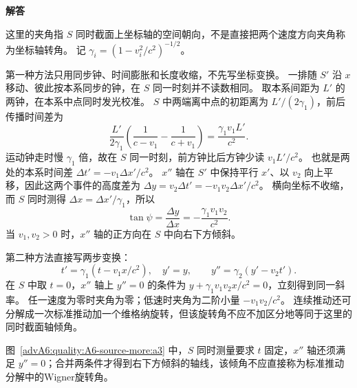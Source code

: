 \begin{advsolution}
\begin{center}\begin{minipage}{.96\linewidth}\centering
\raggedright{\bfseries\color{DeepBlue}解答}\par\smallskip\centering

\label{advA6:quality:A6-source-more:a3}
\end{minipage}\end{center}

这里的夹角指 $S$ 同时截面上坐标轴的空间朝向，不是直接把两个速度方向夹角称为坐标轴转角。
记 $\gamma_i=(1-v_i^2/c^2)^{-1/2}$。

第一种方法只用同步钟、时间膨胀和长度收缩，不先写坐标变换。
一排随 $S'$ 沿 $x$ 移动、彼此按本系同步的钟，在 $S$ 同一时刻并不读数相同。
取本系间距为 $L'$ 的两钟，在本系中点同时发光校准。
$S$ 中两端离中点的初距离为 $L'/(2\gamma_1)$，前后传播时间差为
\[
 \frac{L'}{2\gamma_1}\left(\frac1{c-v_1}-\frac1{c+v_1}\right)
 =\frac{\gamma_1v_1L'}{c^2}.
\]
运动钟走时慢 $\gamma_1$ 倍，故在 $S$ 同一时刻，前方钟比后方钟少读 $v_1L'/c^2$。
也就是两处的本系时间差 $\Delta t'=-v_1\Delta x'/c^2$。
$x''$ 轴在 $S'$ 中保持平行 $x'$、以 $v_2$ 向上平移，因此这两个事件的高度差为
$\Delta y=v_2\Delta t'=-v_1v_2\Delta x'/c^2$。
横向坐标不收缩，而 $S$ 同时测得 $\Delta x=\Delta x'/\gamma_1$，所以
\[
 \boxed{\tan\psi=\frac{\Delta y}{\Delta x}
 =-\frac{\gamma_1v_1v_2}{c^2}}.
\]
当 $v_1,v_2>0$ 时，$x''$ 轴的正方向在 $S$ 中向右下方倾斜。

第二种方法直接写两步变换：
\[
 t'=\gamma_1(t-v_1x/c^2),\quad y'=y,
 \qquad y''=\gamma_2(y'-v_2t').
\]
在 $S$ 中取 $t=0$，$x''$ 轴上 $y''=0$ 的条件为
$y+\gamma_1v_1v_2x/c^2=0$，立刻得到同一斜率。
任一速度为零时夹角为零；低速时夹角为二阶小量 $-v_1v_2/c^2$。
连续推动还可分解成一次标准推动加一个维格纳旋转，但该旋转角不应不加区分地等同于这里的同时截面轴倾角。

图~\ref{advA6:quality:A6-source-more:a3} 中，$S$ 同时测量要求 $t$ 固定，$x''$ 轴还须满足 $y''=0$；合并两条件才得到右下方倾斜的轴线，该倾角不应直接称为标准推动分解中的Wigner旋转角。
\end{advsolution}

